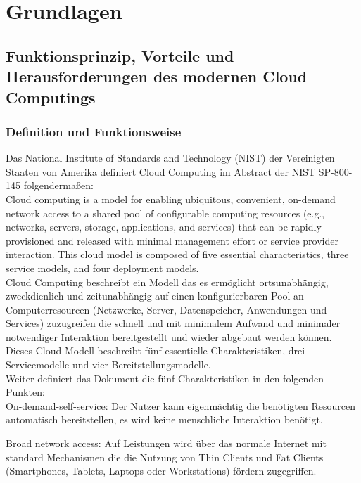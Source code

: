 
\chapter{Grundlagen}
\label{sec:grundl}

\section{Funktionsprinzip, Vorteile und Herausforderungen des modernen Cloud Computings}

\subsection{Definition und Funktionsweise}

Das National Institute of Standards and Technology (NIST) der Vereinigten
Staaten von Amerika definiert Cloud Computing im Abstract der NIST SP-800-145
folgendermaßen:\\

Cloud computing is a model for enabling ubiquitous, convenient, on-demand network access to a shared
pool of configurable computing resources (e.g., networks, servers, storage, applications, and services) that
can be rapidly provisioned and released with minimal management effort or service provider interaction.
This cloud model is composed of five essential characteristics, three service models, and four deployment
models.\\

Cloud Computing beschreibt ein Modell das es ermöglicht ortsunabhängig, zweckdienlich und
zeitunabhängig auf einen konfigurierbaren Pool an Computerresourcen (Netzwerke, Server,
Datenspeicher, Anwendungen und Services) zuzugreifen die schnell und mit minimalem
Aufwand und minimaler notwendiger Interaktion bereitgestellt und wieder abgebaut
werden können.
Dieses Cloud Modell beschreibt fünf essentielle Charakteristiken, drei Servicemodelle
und vier Bereitstellungsmodelle.\\

Weiter definiert das Dokument die fünf Charakteristiken in den folgenden Punkten:\\

On-demand-self-service: Der Nutzer kann eigenmächtig die benötigten Resourcen
automatisch bereitstellen, es wird keine menschliche Interaktion benötigt.

Broad network access: Auf Leistungen wird über das normale Internet mit standard
Mechanismen die die Nutzung von Thin Clients und Fat Clients (Smartphones, Tablets,
Laptops oder Workstations) fördern zugegriffen.
 
